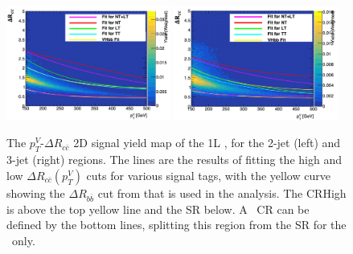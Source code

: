 \begin{figure}[h!]
  \center
  \includegraphics[width=0.48\textwidth]{Images/VH/dRccpTV/sr1.png}
  \includegraphics[width=0.48\textwidth]{Images/VH/dRccpTV/sr2.png}
  \caption{The $p_T^V$-$\Delta R_{c\bar{c}}$ 2D signal yield map of the 1L \vhc, for the 2-jet (left) and 3-jet (right) regions. The lines are the results of fitting the high and low $\Delta R_{c\bar{c}}(p_T^V)$ cuts for various signal tags, with the yellow curve showing the $\Delta R_{b\bar{b}}$ cut from \vhb that is used in the analysis. The CRHigh is above the top yellow line and the SR below. A \lowdr\ CR can be defined by the bottom lines, splitting this region from the SR for the \vhb\ only.} 
  \label{fig:drccptvCutsVHcc}
\end{figure}

